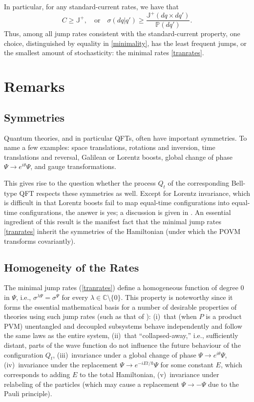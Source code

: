 \documentclass[12pt]{article}
\newcommand{\CCC}{\mathbb{C}} %
\newcommand{\E}{e} %
\newcommand{\I}{i} %
\newcommand{\1}{\mathbf{1}} %
\newcommand{\measure}{\mathbb{P}} %
\newcommand{\current}{\mathbb{J}}
\newcommand{\pov}{{P}}%
\begin{document}
In particular, for any standard-current rates, we have that
\begin{equation}\label{minimality}
   C \geq \current^+, \quad \text{or} \quad \sigma(dq|q') \geq
   \frac{\current^+(dq \times dq')}{\measure(dq')}.
\end{equation}
Thus, among all jump rates consistent with the standard-current
property, one choice, distinguished by equality in \eqref{minimality},
has the least frequent jumps, or the smallest amount of stochasticity:
the minimal rates \eqref{tranrates}.



\section{Remarks}\label{sec:remarks}

\subsection{Symmetries}\label{sec:symm}

   Quantum theories, and in particular QFTs, often have important
   symmetries. To name a few examples: space translations, rotations
   and inversion, time translations and reversal, Galilean or Lorentz
   boosts, global change of phase $\Psi \to \E^{\I\theta} \Psi$, and
   gauge transformations.

   This gives rise to the question whether the process $Q_t$ of the
   corresponding Bell-type QFT respects these symmetries as well.
   Except for Lorentz invariance, which is difficult in that Lorentz
   boosts fail to map equal-time configurations into equal-time
   configurations, the answer is yes; a discussion is given in
   \cite[Sec.~6.1]{crea2B}. An essential ingredient of this result is
   the manifest fact that the minimal jump rates \eqref{tranrates}
   inherit the symmetries of the Hamiltonian (under which the POVM
   transforms covariantly).


\subsection{Homogeneity of the Rates}

   The minimal jump rates (\ref{tranrates}) define a homogeneous
   function of degree 0 in $\Psi$, i.e., $\sigma^{\lambda\Psi} =
   \sigma^{\Psi}$ for every $\lambda\in \CCC \setminus \{0\}$. This
   property is noteworthy since it forms the essential mathematical
   basis for a number of desirable properties of theories using such
   jump rates (such as that of \cite{crea1}): (i)~that (when $\pov$ is
   a product PVM) unentangled and decoupled subsystems behave
   independently and follow the same laws as the entire system,
   (ii)~that ``collapsed-away,'' i.e., sufficiently distant, parts of
   the wave function do not influence the future behaviour of the
   configuration $Q_t$, (iii)~invariance under a global change of phase
   $\Psi \to \E^{\I\theta}\Psi$, (iv)~invariance under the replacement
   $\Psi \to \E^{-\I Et/\hbar} \Psi$ for some constant $E$, which
   corresponds to adding $E$ to the total Hamiltonian, (v)~invariance
   under relabeling of the particles (which may cause a replacement
   $\Psi \to -\Psi$ due to the Pauli principle).
\end{document}
